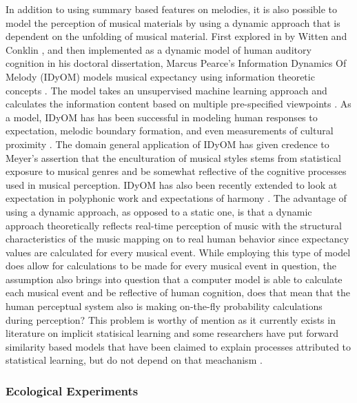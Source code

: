 \documentclass[]{book}
\begin{document}
In addition to using summary based features on melodies, it is also possible to model the perception of musical materials by using a dynamic approach that is dependent on the unfolding of musical material.
First explored in by Witten and Conklin \citep{conklinMultipleViewpointSystems1995}, and then implemented as a dynamic model of human auditory cognition in his doctoral dissertation, Marcus Pearce's Information Dynamics Of Melody (IDyOM) models musical expectancy using information theoretic concepts \citep{shannonMathematicalTheoryCommunication1948}.
The model takes an unsupervised machine learning approach and calculates the information content based on multiple pre-specified viewpoints \citep{pearceConstructionEvaluationStatistical2005}.
As a model, IDyOM has has been successful in modeling human responses to expectation, melodic boundary formation, and even measurements of cultural proximity \citep{pearceAuditoryExpectationInformation2012, pearceStatisticalLearningProbabilistic2018a}.
The domain general application of IDyOM has given credence to Meyer's assertion that the enculturation of musical styles stems from statistical exposure to musical genres and be somewhat reflective of the cognitive processes used in musical perception.
IDyOM has also been recently extended to look at expectation in polyphonic work \citep{sauvePredictionPolyphonyModelling2017} and expectations of harmony \citep{harrisonDissociatingSensoryCognitive2018}.
The advantage of using a dynamic approach, as opposed to a static one, is that a dynamic approach theoretically reflects real-time perception of music with the structural characteristics of the music mapping on to real human behavior since expectancy values are calculated for every musical event.
While employing this type of model does allow for calculations to be made for every musical event in question, the assumption also brings into question that a computer model is able to calculate each musical event and be reflective of human cognition, does that mean that the human perceptual system also is making on-the-fly probability calculations during perception?
This problem is worthy of mention as it currently exists in literature on implicit statisical learning \citep{perruchetImplicitLearningStatistical2006} and some researchers have put forward similarity based models that have been claimed to explain processes attributed to statistical learning, but do not depend on that meachanism \citep{jamiesonApplyingExemplarModel2009}.

\hypertarget{ecological-experiments}{%
\subsubsection{Ecological Experiments}\label{ecological-experiments}}
\end{document}

